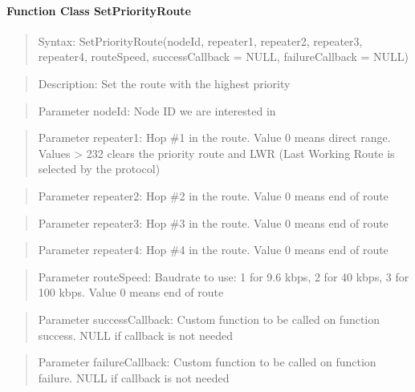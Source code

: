\paragraph{Function Class SetPriorityRoute}
\begin{quote}Syntax: SetPriorityRoute(nodeId, repeater1, repeater2, repeater3, repeater4, routeSpeed, successCallback = NULL, failureCallback = NULL)\end{quote}
\begin{quote}Description: Set the route with the highest priority\end{quote}
\begin{quote}Parameter nodeId: Node ID we are interested in\end{quote}
\begin{quote}Parameter repeater1: Hop \#1 in the route. Value 0 means direct range. Values > 232 clears the priority route and LWR (Last Working Route is selected by the protocol)\end{quote}
\begin{quote}Parameter repeater2: Hop \#2 in the route. Value 0 means end of route\end{quote}
\begin{quote}Parameter repeater3: Hop \#3 in the route. Value 0 means end of route\end{quote}
\begin{quote}Parameter repeater4: Hop \#4 in the route. Value 0 means end of route\end{quote}
\begin{quote}Parameter routeSpeed: Baudrate to use: 1 for 9.6 kbps, 2 for 40 kbps, 3 for 100 kbps. Value 0 means end of route\end{quote}
\begin{quote}Parameter successCallback: Custom function to be called on function success. NULL if callback is not needed\end{quote}
\begin{quote}Parameter failureCallback: Custom function to be called on function failure. NULL if callback is not needed\end{quote}


